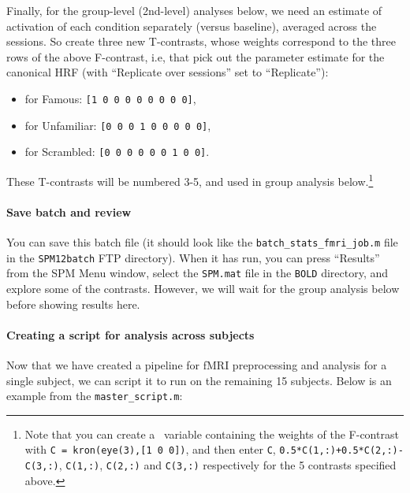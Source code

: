 Finally, for the group-level (2nd-level) analyses below, we need an estimate of activation of each condition separately (versus baseline), averaged across the sessions. So create three new T-contrasts, whose weights correspond to the three rows of the above F-contrast, i.e, that pick out the parameter estimate for the canonical HRF (with ``Replicate over sessions'' set to ``Replicate''):

\begin{itemize}
    \setlength\itemsep{0em}
	\item[] for Famous: \texttt{[1 0 0 0 0 0 0 0 0]},
	\item[] for Unfamiliar: \texttt{[0 0 0 1 0 0 0 0 0]},
	\item[] for Scrambled: \texttt{[0 0 0 0 0 0 1 0 0]}.
\end{itemize}

These T-contrasts will be numbered 3-5, and used in group analysis below.\footnote{
Note that you can create a \matlab\ variable containing the weights of the F-contrast with \texttt{C = kron(eye(3),[1 0 0])}, and then enter \texttt{C}, \texttt{0.5*C(1,:)+0.5*C(2,:)-C(3,:)}, \texttt{C(1,:)}, \texttt{C(2,:)} and \texttt{C(3,:)} respectively for the 5 contrasts specified above.
}

\paragraph{Save batch and review}

You can save this batch file (it should look like the \texttt{batch\_stats\_fmri\_job.m} file in the \texttt{SPM12batch} FTP directory). When it has run, you can press ``Results'' from the SPM Menu window, select the \texttt{SPM.mat} file in the \texttt{BOLD} directory, and explore some of the contrasts. However, we will wait for the group analysis below before showing results here.

\paragraph{Creating a script for analysis across subjects}

Now that we have created a pipeline for fMRI preprocessing and analysis for a single subject, we can script it to run on the remaining 15 subjects. Below is an example from the \texttt{master\_script.m}:

